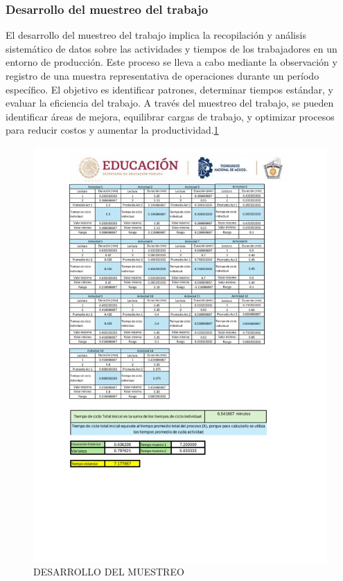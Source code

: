     \subsubsection{Desarrollo del muestreo del trabajo}
    El desarrollo del muestreo del trabajo implica la recopilación y análisis sistemático de datos sobre las actividades y tiempos de los trabajadores en un entorno de producción. Este proceso se lleva a cabo mediante la observación y registro de una muestra representativa de operaciones durante un período específico. El objetivo es identificar patrones, determinar tiempos estándar, y evaluar la eficiencia del trabajo. A través del muestreo del trabajo, se pueden identificar áreas de mejora, equilibrar cargas de trabajo, y optimizar procesos para reducir costos y aumentar la productividad.\ref{muestreo}
    \begin{figure}
        \centering
    \includegraphics[trim = {0mm 0mm 0mm 0mm},clip,scale=0.3]{24/Img/muestreodeVideos2.pdf}
    \caption{DESARROLLO DEL MUESTREO}
        \label{muestreo}
    \end{figure}

